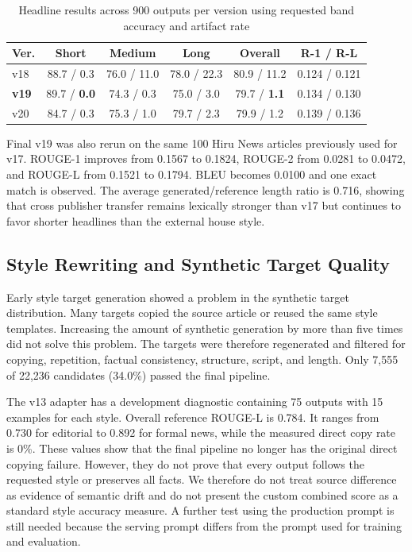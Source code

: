 \documentclass[a4paper,conference]{IEEEtran}
\begin{document}
\begin{table}[!t]
\caption{Headline results across 900 outputs per version using requested band accuracy and artifact rate}
\label{tab:headline}
\centering
\footnotesize
\setlength{\tabcolsep}{2.1pt}
\renewcommand{\arraystretch}{1.04}
\begin{tabular}{|l|c|c|c|c|c|}
\hline
\textbf{Ver.} & \textbf{Short} & \textbf{Medium} & \textbf{Long} & \textbf{Overall} & \textbf{R-1 / R-L} \\
\hline
v18 & 88.7 / 0.3 & 76.0 / 11.0 & 78.0 / 22.3 & 80.9 / 11.2 & 0.124 / 0.121 \\
\hline
\textbf{v19} & 89.7 / \textbf{0.0} & 74.3 / 0.3 & 75.0 / 3.0 & 79.7 / \textbf{1.1} & 0.134 / 0.130 \\
\hline
v20 & 84.7 / 0.3 & 75.3 / 1.0 & 79.7 / 2.3 & 79.9 / 1.2 & 0.139 / 0.136 \\
\hline
\end{tabular}
\end{table}

Final v19 was also rerun on the same 100 Hiru News articles previously used
for v17. ROUGE-1 improves from 0.1567 to 0.1824, ROUGE-2 from 0.0281 to
0.0472, and ROUGE-L from 0.1521 to 0.1794. BLEU becomes 0.0100 and one exact
match is observed. The average generated/reference length ratio is 0.716,
showing that cross publisher transfer remains lexically stronger than v17 but
continues to favor shorter headlines than the external house style.

\subsection{Style Rewriting and Synthetic Target Quality}
Early style target generation showed a problem in the synthetic target
distribution. Many targets copied the source article or reused the same style
templates. Increasing the amount of synthetic generation by more than five
times did not solve this problem. The targets were therefore regenerated and
filtered for copying, repetition, factual consistency, structure, script, and
length. Only 7,555 of 22,236 candidates (34.0\%) passed the final pipeline.

The v13 adapter has a development diagnostic containing 75 outputs with 15
examples for each style. Overall reference ROUGE-L is 0.784. It ranges from
0.730 for editorial to 0.892 for formal news, while the measured direct copy
rate is 0\%. These values show that the final pipeline no longer has the
original direct copying failure. However, they do not prove that every output
follows the requested style or preserves all facts. We therefore do not treat
source difference as evidence of semantic drift and do not present the custom
combined score as a standard style accuracy measure. A further test using the
production prompt is still needed because the serving prompt differs from the
prompt used for training and evaluation.
\end{document}
